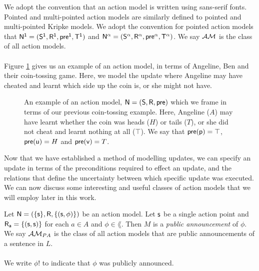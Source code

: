 We adopt the convention that an action model is written using sans-serif fonts.
Pointed and multi-pointed action models are similarly defined to pointed and multi-pointed Kripke
models.
We adopt the convention for pointed action models that $\mathrm{\mathsf{\mathrm{\mathsf{N}}^1 = (S^1, R^1,
pre^1, T^1)}}$ and $\mathrm{\mathsf{\mathrm{\mathsf{N}}^\alpha =
  (S^\alpha,R^\alpha,pre^\alpha,T^\alpha)}}$.
We say $\mathcal{AM}$ is the class of all action models.\\
\\
Figure \ref{figure:eventModelExample} gives us an example of an action model, in terms of Angeline, Ben and
their coin-tossing game.
Here, we model the update where Angeline may have cheated and learnt which side up the coin is, or she might not have.

\begin{figure}
\centering
{}
\caption[Action model example of coin-game update]{An example of an action model, $\mathrm{\mathsf{N}} = (\mathrm{\mathsf{S}},\mathrm{\mathsf{R}},\mathrm{\mathsf{pre}})$ which we frame in terms of our previous coin-tossing example.
Here, Angeline ($A$) may have learnt whether the coin was heads ($H$) or tails ($T$), or she did not
cheat and learnt nothing at all ($\top$).
We say that $\mathrm{\mathsf{pre}}(\mathrm{\mathsf{p}}) = \top$, $\mathrm{\mathsf{pre}}(\mathrm{\mathsf{u}}) = H$ and $\mathrm{\mathsf{pre}}(\mathrm{\mathsf{v}}) = T$.}
\label{figure:eventModelExample}
\end{figure}

Now that we have established a method of modelling updates, we can specify an update in terms of the
preconditions required to effect an update, and the relations that define the uncertainty between
which specific update was executed.
We can now discuss some interesting and useful classes of action models that we will employ later in this work.

\begin{defn} \label{pub}
Let $\mathrm{\mathsf{\mathrm{\mathsf{N}} = (\{ s \}, R, \{ (s, \phi)\}}})$ be an action model.
Let $\mathrm{\mathsf{s}}$ be a single action point and $\mathrm{\mathsf{R_a = \{(s, s)\}}}$ for each $a \in A$ and $\phi
\in \lang$.
Then $M$ is a {\em public announcement} of $\phi$.
We say $\mathcal{AM}_{PA}$ is the class of all action models that
are public announcements of a sentence in $L$.\\
\\
We write $\phi!$ to indicate that $\phi$ was publicly announced.
\end{defn}

